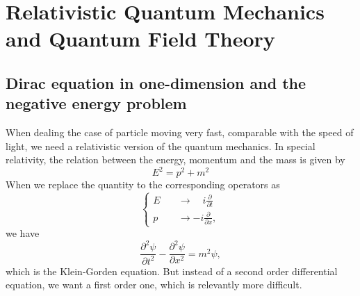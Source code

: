\documentclass{article}
\newcommand{\be}{\begin{equation}}
\newcommand{\ee}{\end{equation}}
\newcommand{\p}{\partial}
\renewcommand{\1}{\left}
\renewcommand{\2}{\right}
\begin{document}
\section{Relativistic Quantum Mechanics and Quantum Field Theory}
\subsection{Dirac equation in one-dimension and the negative energy problem}
When dealing the case of particle moving very fast, comparable with the speed of light, we need a relativistic version of the quantum mechanics. In special relativity, the relation between the energy, momentum and the mass is given by
\be\label{ener}
E^2=p^2+m^2
\ee
When we replace the quantity to the corresponding operators as
\be\1\{\begin{split}
E &\quad\rightarrow \quad i\frac{\p}{\p t}\\
p &\quad\rightarrow -i\frac{\p}{\p x},
\end{split}\2.\ee
we have 
\be
\frac{\p^2\psi}{\p t^2}-\frac{\p^2\psi}{\p x^2}=m^2\psi,
\ee
which is the Klein-Gorden equation. But instead of a second order differential equation, we want a first order one, which is relevantly more difficult.\\
\end{document}
